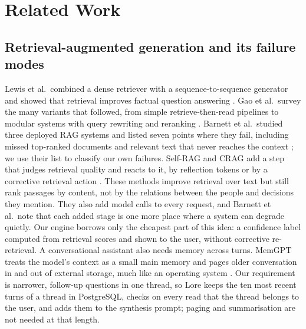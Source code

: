 \documentclass[12pt,onecolumn,draftclsnofoot]{IEEEtran}
\begin{document}
\section{Related Work}

\subsection{Retrieval-augmented generation and its failure modes}
Lewis et al.\ combined a dense retriever with a sequence-to-sequence generator and showed that retrieval improves factual question answering \cite{lewis2020rag}. Gao et al.\ survey the many variants that followed, from simple retrieve-then-read pipelines to modular systems with query rewriting and reranking \cite{gao2023ragsurvey}. Barnett et al.\ studied three deployed RAG systems and listed seven points where they fail, including missed top-ranked documents and relevant text that never reaches the context \cite{barnett2024failure}; we use their list to classify our own failures. Self-RAG and CRAG add a step that judges retrieval quality and reacts to it, by reflection tokens or by a corrective retrieval action \cite{asai2023selfrag,yan2024crag}. These methods improve retrieval over text but still rank passages by content, not by the relations between the people and decisions they mention. They also add model calls to every request, and Barnett et al.\ note that each added stage is one more place where a system can degrade quietly. Our engine borrows only the cheapest part of this idea: a confidence label computed from retrieval scores and shown to the user, without corrective re-retrieval. A conversational assistant also needs memory across turns. MemGPT treats the model's context as a small main memory and pages older conversation in and out of external storage, much like an operating system \cite{packer2023memgpt}. Our requirement is narrower, follow-up questions in one thread, so Lore keeps the ten most recent turns of a thread in PostgreSQL, checks on every read that the thread belongs to the user, and adds them to the synthesis prompt; paging and summarisation are not needed at that length.
\end{document}
